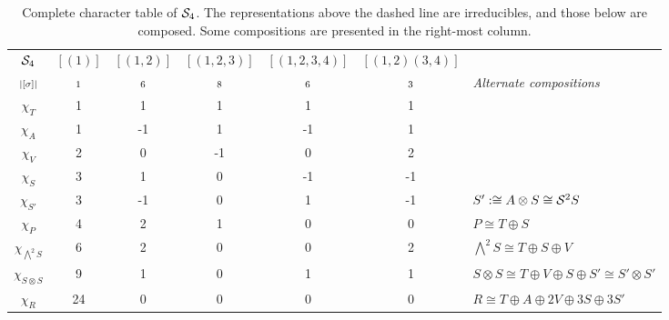 \begin{example}
	\begin{table}[hbt!]
		\centering
		\begin{tabular}{c | c c c c c | l}
			$\mathcal{S}_4$         & $[(1)]$   & $[(1,2)]$  & $[(1,2,3)]$ & $[(1,2,3,4)]$ & $[(1,2)(3,4)]$ &                                                              \\
			$\scriptstyle|[\sigma]|$    & $\scriptstyle 1$ & $\scriptstyle 6$ & $\scriptstyle 8$ & $\scriptstyle 6$  & $\scriptstyle 3$      & \textit{Alternate compositions}                              \\ \hline
			$\chi_T$       & 1       & 1       & 1       & 1        & 1            &                                                              \\
			$\chi_A$       & 1       & -1      & 1       & -1       & 1            &                                                              \\
			$\chi_V$       & 2       & 0       & -1      & 0        & 2            &                                                              \\
			$\chi_S$       & 3       & 1       & 0       & -1       & -1           &                                                              \\
			$\chi_{S'}$ & 3       & -1      & 0       & 1        & -1           & $S' :\cong A \otimes S \cong \mathcal{S}^2S$                                  \\ \hline\hline
			$\chi_P$       & 4       & 2       & 1       & 0        & 0            & $P \cong T \oplus S$                                         \\
			$\chi_{\bigwedge^2S}$    & 6       & 2       & 0       & 0        & 2            & $\bigwedge^2S \cong T \oplus S \oplus V$                     \\
			$\chi_{S \otimes S}$ & 9       & 1       & 0       & 1        & 1            & $S \otimes S \cong T \oplus V \oplus S \oplus S' \cong S' \otimes S'$ \\
			$\chi_R$       & 24      & 0       & 0       & 0        & 0            & $R \cong T \oplus A \oplus 2V \oplus 3S \oplus 3S'$
		\end{tabular}
		\caption{Complete character table of $\mathcal{S}_4$. The representations above the dashed line are irreducibles, and those below are composed. Some compositions are presented in the right-most column.}
		\label{table:completecharS4}
	\end{table}
\end{example}


